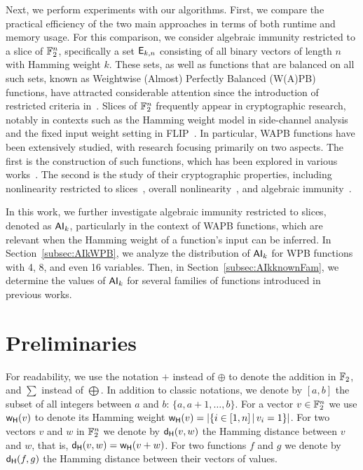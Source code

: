 \documentclass[11pt]{llncs}
\begin{document}
Next, we perform experiments with our algorithms. 
First, we compare the practical efficiency of the two main approaches in terms of both runtime and memory usage. 
For this comparison, we consider algebraic immunity restricted to a slice of $\mathbb{F}_2^n$, specifically a set $\mathsf{E}_{k,n}$ consisting of all binary vectors of length $n$ with Hamming weight $k$.  
These sets, as well as functions that are balanced on all such sets, known as Weightwise (Almost) Perfectly Balanced (W(A)PB) functions, have attracted considerable attention since the introduction of restricted criteria in~\cite{TOSC:CarMeaRot17}.  
Slices of $\mathbb{F}_2^n$ frequently appear in cryptographic research, notably in contexts such as the Hamming weight model in side-channel analysis and the fixed input weight setting in FLIP~\cite{EC:MJSC16}. 
In particular, WAPB functions have been extensively studied, with research focusing primarily on two aspects. The first is the construction of such functions, which has been explored in various works~\cite{TOSC:CarMeaRot17,CC:TangLiu19,DCC:LiuMes19,DAM:LiSu20,CC:MesSu21,DAM:ZhuSu22,CEC:MPJDL22,ACI:ManKuLar22,INDO:GinMea22,CC:MSLZ22,DAM:GuoSu22,DAM:ZLCQZ23,AMC:ZhangSu23,Mat:ZJZQ23,ASIACCS:YCL+23,CCDS:GinMea24,AMC:DalMal23,SAC:Meaux24,eprint:DalMalMea24}. The second is the study of their cryptographic properties, including nonlinearity restricted to slices~\cite{DAM:GinMea22}, overall nonlinearity~\cite{C2SI:GinMea23}, and algebraic immunity~\cite{Latin:GinMea23}.  

In this work, we further investigate algebraic immunity restricted to slices, denoted as $\mathsf{AI}_k$, particularly in the context of WAPB functions, which are relevant when the Hamming weight of a function’s input can be inferred. In Section~\ref{subsec:AIkWPB}, we analyze the distribution of $\mathsf{AI}_k$ for WPB functions with 4, 8, and even 16 variables. Then, in Section~\ref{subsec:AIkknownFam}, we determine the values of $\mathsf{AI}_{k}$ for several families of functions introduced in previous works.  


\section{Preliminaries}\label{sec:prelim}


For readability, we use the notation $+$ instead of 
$\oplus$ to denote the addition in $\mathbb{F}_2$, and $\sum$ instead of $\bigoplus$. 
In addition to classic notations, we denote by $ [a,b] $ the subset of all integers between $a$ and $b$: $\{a, a+1, \ldots,b\}$. 
For a vector $v\in \mathbb{F}_2^n$ we use $\mathsf{w_H}(v)$ to denote its Hamming weight $\mathsf{w_H}(v)=|\{ i \in [1,n] \, | \, v_i=1 \}|$. 
For two vectors $v$ and $w$ in $\mathbb{F}_2^n$ we denote by $\mathsf{d_H}(v,w)$ the Hamming distance between $v$ and $w$, that is, $\mathsf{d_H}(v,w)=\mathsf{w_H}(v+w)$. 
For two functions $f$ and $g$ we denote by $\mathsf{d_H}(f,g)$ the Hamming distance between their vectors of values.
\end{document}
